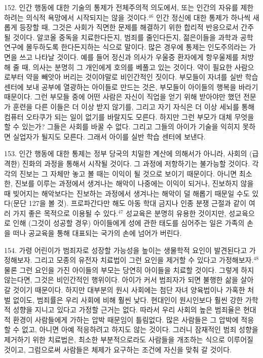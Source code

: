 \documentclass[11pt,a4paper]{article}
\begin{document}
\begin{multicols}{2}
152. 인간 행동에 대한 기술의 통제가 전체주의적 의도에서, 또는 인간의 자유를 제한하려는 의식적  욕망에서 시작되지는 않을 것이다.\hyperlink{46}{$^{46}$} 인간 정신에 대한 통제가 하나씩 새롭게 등장할 때, 그것은 사회가  직면한 문제를 해결하기 위한 합리적 반응으로서 간주될 것이다. 알코올 중독을 치료한다든지, 범죄를  줄인다든지, 젊은이들을 과학과 공학 연구에 몰두하도록 한다든지하는 식으로 말이다. 많은 경우에  통제는 인도주의라는 가면을 쓰고 나타날 것이다. 예를 들어 정신과 의사가 우울증 환자에게 항우울제를  처방해 줄 때, 의사는 분명히 그 개인에게 호의를 베풀고 있는 것이다. 약이 필요한 사람으로부터 약을  빼앗아 버리는 것이야말로 비인간적인 짓이다. 부모들이 자녀를 실반 학습 센터에 보내 공부에 열광하는  아이들로 만드는 것은, 부모들이 아이들의 행복을 바라기 때문이다. 그런 부모들 중에 어떤 사람은 자신이 직업을 얻기 위해 받아야만 했던 전문가 훈련을 다른 이들은 더 이상 받지 않기를, 그리고 자기 자식은 더  이상 세뇌를 통해 컴퓨터 오타쿠가 되는 일이 없기를 바랄지도 모른다. 하지만 그런 부모가 대체 무엇을  할 수 있는가? 그들은 사회를 바꿀 수 없다. 그리고 그들의 아이가 기술을 익히지 못하면 실업자가 될지도 모른다. 그래서 아이를 실반 학습 센터에 보낸다.  


153. 인간 행동에 대한 통제는 정부 당국의 치밀한 계산에 의해서가 아니라, 사회의 (급격한) 진화의  과정을 통해서 시작될 것이다. 그 과정에 저항하기는 불가능할 것이다. 각각의 진보는 그 자체만 놓고 볼 때는 이익이 될 것으로 보이기 때문이다. 아니면 최소한, 진보를 이루는 과정에서 생겨나는 해악이  나중에는 이익이 되거나, 진보하지 않을 때 빚어지는 해악보다는 진보하는 과정에서 생겨나는 해악이 덜 해롭기 때문일 수도 있다(문단 127을 볼 것). 프로파간다만 해도 아동 학대 금지나 인종 분쟁 근절과 같이 여러 가지 좋은 목적으로 이용될 수 있다.\hyperlink{47}{$^{47}$} 성교육은 분명히 유용한 것이지만, 성교육으로 인해 (그것이  성공할 경우) 아이들에게 성에 관한 태도를 심어주는 일은 가족의 손을 떠나 공교육을 통해 대표되는  국가의 손에 넘어가 버린다. 


154. 가령 어린이가 범죄자로 성장할 가능성을 높이는 생물학적 요인이 발견된다고 가정해보자. 그리고  모종의 유전자 치료법이 그런 요인을 제거할 수 있다고 가정해보자.\hyperlink{48}{$^{48}$} 물론 그런 요인을 가진 아이들의  부모는 당연히 아이들을 치료할 것이다. 그렇게 하지 않는다면, 그것은 비인간적인 행위이다. 아이가 커서 범죄자가 되면 불행한 삶을 살아갈 것이기 때문이다. 하지만 대부분의 원시 사회에는 첨단 자녀 양육법이나 가혹한 처벌 없이도, 범죄률은 우리 사회에 비해 훨씬 낮다. 현대인이 원시인보다 훨씬 강한  가학적 성향을 지니고 있다고 가정할 근거는 없다. 따라서 우리 사회의 높은 범죄율은 현대적 환경이  사람들에게 가하는 압박 때문임이 틀림없다. 많은 사람들은 그 압박에 적응할 수 없고, 아니면 아예  적응하려고 하지도 않는 것이다. 그러니 잠재적인 범죄 성향을 제거하기 위한 치료법은, 최소한  부분적으로라도 사람들을 개조하는 식으로 이루어질 것이고, 그럼으로써 사람들은 체제가 요구하는  조건에 자신을 맞춰 갈 것이다.  



\end{multicols}
\end{document}
